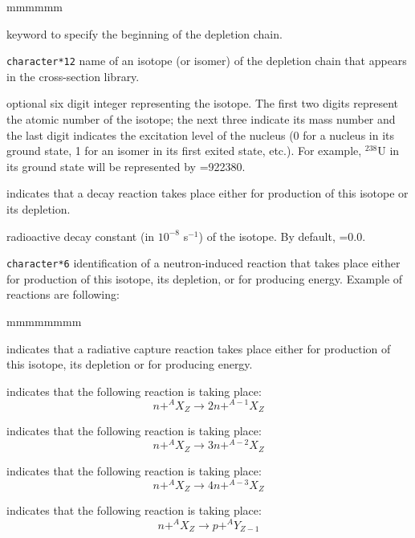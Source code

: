 \begin{ListeDeDescription}{mmmmmm}

\item[\moc{CHAIN}] keyword to specify the beginning of the depletion chain.

\item[\dusa{NAMDPL}] {\tt character*12} name of an isotope (or isomer) of the
depletion chain that appears in the cross-section library.

\item[\dusa{izae}] optional six digit integer representing the isotope. The first two
digits represent the atomic number of the isotope; the next three indicate its
mass number and the last digit indicates the  excitation level of the nucleus (0
for a nucleus in its ground state, 1 for an isomer in its first exited state,
etc.). For example, $^{238}$U in its ground state will be represented by
=922380.

\item[\moc{DECAY}] indicates that a decay reaction takes place either for
production of this isotope or its depletion.

\item[\dusa{dcr}] radioactive decay constant (in $10^{-8}$ s$^{-1}$) of the
isotope. By default, =0.0.

\item[\dusa{reaction}] {\tt character*6} identification of a neutron-induced
reaction that takes place either for production of this isotope, its depletion,
or for producing energy. Example of reactions are following:

\begin{ListeDeDescription}{mmmmmmmm}
\item[\moc{NG}] indicates that a radiative capture reaction takes place either
for production of this isotope, its depletion or for producing energy.

\item[\moc{N2N}] indicates that the following reaction is taking place:
$$ n +^{A}X_Z \to 2 n + ^{A-1}X_Z$$

\item[\moc{N3N}] indicates that the following reaction is taking place:
$$ n +^{A}X_Z \to 3 n + ^{A-2}X_Z$$

\item[\moc{N4N}] indicates that the following reaction is taking place:
$$ n +^{A}X_Z \to 4 n + ^{A-3}X_Z$$

\item[\moc{NP}] indicates that the following reaction is taking place:
$$ n +^{A}X_Z \to p + ^AY_{Z-1}$$


\end{ListeDeDescription}
\end{ListeDeDescription}

